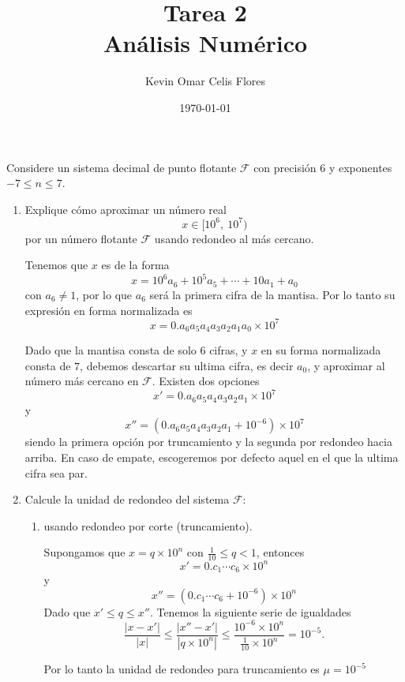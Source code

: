 \documentclass[11pt, oneside]{article}
\title{Tarea 2\\Análisis Numérico}
\author{Kevin Omar Celis Flores}
\date{\today}
\begin{document}
\maketitle

\begin{problema} Considere un sistema decimal de punto flotante \(\mathcal{F}\) con precisión 6 y exponentes \(-7\le n\le7\).

    \begin{enumerate}
        \item Explique cómo aproximar  un número real $$x\in[10^6,\ 10^7)$$ por un número flotante $\mathcal{F}$ usando redondeo al más cercano.
        
        Tenemos que \(x\) es de la forma \[x=10^6a_6+10^5a_5+\cdots+10a_1+a_0\] con \(a_6\not=1\), por lo que \(a_6\) será la primera cifra de la mantisa. Por lo tanto su expresión en forma normalizada es \[x=0.a_6a_5a_4a_3a_2a_1a_0\times10^7\] 
        
        Dado que la mantisa consta de solo 6 cifras, y \(x\) en su forma normalizada consta de $7$, debemos descartar su ultima cifra, es decir \(a_0\), y aproximar al número más cercano en \(\mathcal{F}\). Existen dos opciones \[x'=0.a_6a_5a_4a_3a_2a_1\times10^7\] y \[x''=\left(0.a_6a_5a_4a_3a_2a_1+10^{-6}\right)\times10^7\] siendo la primera opción por truncamiento y la segunda por redondeo hacia arriba. En caso de empate, escogeremos por defecto aquel en el que la ultima cifra sea par.

        \item Calcule la unidad de redondeo del sistema $\mathcal{F}$:

        \begin{enumerate}
            \item usando redondeo por corte (truncamiento). 
            
            Supongamos que \(x=q\times10^n\) con \(\frac{1}{10}\le q<1\), entonces \[x'=0.c_1\cdots c_6 \times 10^n\] y \[x''=(0.c_1\cdots c_6+10^{-6})\times10^n\]Dado que \(x'\le q\le x''\). Tenemos la siguiente serie de igualdades
                \begin{equation*}
                    \frac{|x-x'|}{|x|}\le\frac{|x''-x'|}{|q\times10^n|}\le\frac{10^{-6}\times10^n}{\frac{1}{10}\times10^n}=10^{-5}.
                \end{equation*}

                Por lo tanto la unidad de redondeo para truncamiento es \(\mu=10^{-5}\)


\end{enumerate}
\end{enumerate}
\end{problema}
\end{document}
